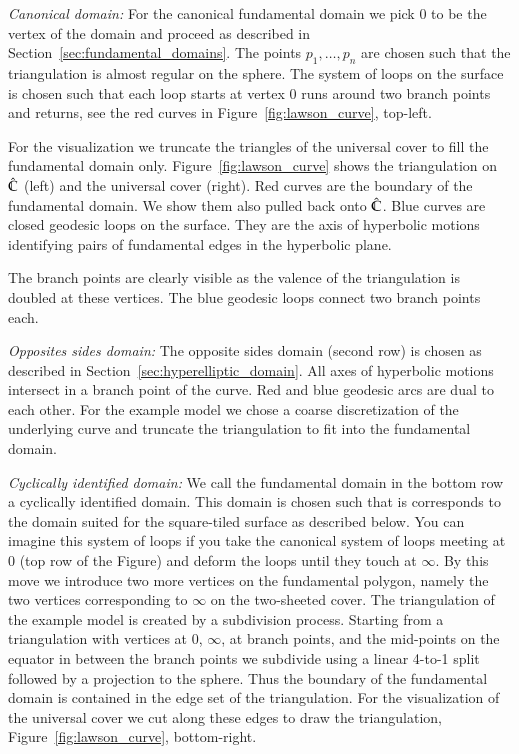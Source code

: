 \documentclass[Thesis]{subfiles}
\begin{document}
\textit{Canonical domain:}
For the canonical fundamental domain we pick $0$ to be the vertex of the domain and proceed as described in Section~\ref{sec:fundamental_domains}.
The points $p_1,\ldots,p_n$ are chosen such that the triangulation is almost regular on the sphere.
The system of loops on the surface is chosen such that each loop starts at vertex $0$ runs around two branch points and returns, see the red curves in Figure~\ref{fig:lawson_curve}, top-left.

For the visualization we truncate the triangles of the universal cover to fill the fundamental domain only.
Figure~\ref{fig:lawson_curve} shows the triangulation on $\hat {\mathbb C}$ (left) and the universal cover (right).
Red curves are the boundary of the fundamental domain.
We show them also pulled back onto $\hat {\mathbb C}$. Blue curves are closed geodesic loops on the surface.
They are the axis of hyperbolic motions identifying pairs of fundamental edges in the hyperbolic plane.

The branch points are clearly visible as the valence of the triangulation is doubled at these vertices.
The blue geodesic loops connect two branch points each.

\textit{Opposites sides domain:}
The opposite sides domain (second row) is chosen as described in Section~\ref{sec:hyperelliptic_domain}.
All axes of hyperbolic motions intersect in a branch point of the curve.
Red and blue geodesic arcs are dual to each other.
For the example model we chose a coarse discretization of the underlying curve and truncate the triangulation to fit into the fundamental domain.

\textit{Cyclically identified domain:}
We call the fundamental domain in the bottom row a cyclically identified domain.
This domain is chosen such that is corresponds to the domain suited for the square-tiled surface as described below.
You can imagine this system of loops if you take the canonical system of loops meeting at $0$ (top row of the Figure) and deform the loops until they touch at $\infty$.
By this move we introduce two more vertices on the fundamental polygon, namely the two vertices corresponding to $\infty$ on the two-sheeted cover.
The triangulation of the example model is created by a subdivision process.
Starting from  a triangulation with vertices at $0$, $\infty$, at branch points, and the mid-points on the equator in between the branch points we subdivide using a linear 4-to-1 split followed by a projection to the sphere. Thus the boundary of the fundamental domain is contained in the edge set of the triangulation. For the visualization of the universal cover we cut along these edges to draw the triangulation, Figure~\ref{fig:lawson_curve}, bottom-right.
\end{document}
